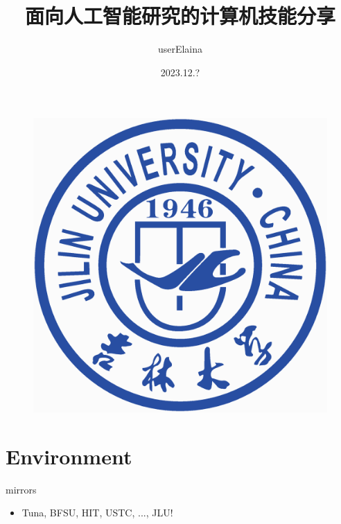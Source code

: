 \documentclass{beamer}
\author{userElaina}
\title{面向人工智能研究的计算机技能分享}
\institute{人工智能学院}
\date{2023.12.?}
\begin{document}
\kaishu
\begin{frame}
    \titlepage
    \begin{figure}[htpb]
        \begin{center}
            \includegraphics[width=0.15\linewidth]{pic/Jilin_University_Logo.eps}
        \end{center}
    \end{figure}
\end{frame}

\begin{frame}
\tableofcontents[sectionstyle=show,subsectionstyle=show/shaded/hide,subsubsectionstyle=show/shaded/hide]
\end{frame}





\section{Environment}

\begin{frame}{mirrors}
    \begin{itemize}
        \item Tuna, BFSU, HIT, USTC, ..., JLU!
    \end{itemize}
\end{frame}
\end{document}
